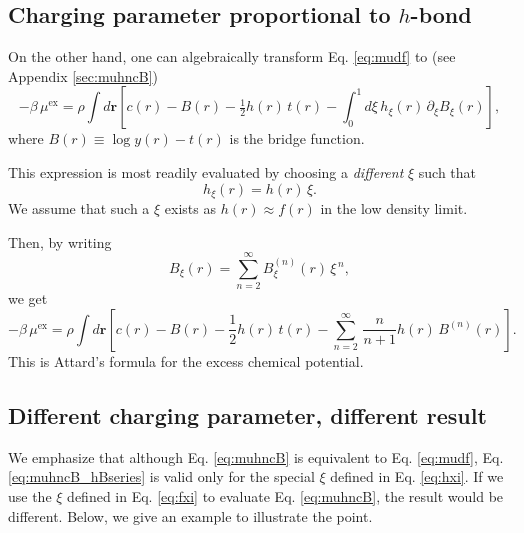 \documentclass[preprint]{revtex4-1}
\newcommand{\vct}[1]{\mathbf{#1}}
\providecommand{\vr}{} %
\renewcommand{\vr}{\vct{r}}
\newcommand{\supex}[1]{ { { #1 }^{ \mathrm{ex} } } }
\newcommand{\muex}{\supex{\mu}}
\begin{document}
\subsection{Charging parameter proportional to $h$-bond}



On the other hand,
one can algebraically transform Eq. \eqref{eq:mudf}
to (see Appendix \ref{sec:muhncB})
%
\begin{equation}
  -\beta \, \muex
=
  \rho \int d\vr
  \left[ c(r) - B(r) - \tfrac{1}{2} h(r) \, t(r)
  - \int_0^1 d\xi \, h_\xi(r) \, \partial_\xi B_\xi(r) \right],
\label{eq:muhncB}
\end{equation}
where $B(r) \equiv \log y(r) - t(r)$ is the bridge function.

This expression is most readily evaluated
by choosing a \emph{different} $\xi$ such that
\begin{equation}
  h_{\xi}(r) = h(r) \, \xi.
  \label{eq:hxi}
\end{equation}
We assume that such a $\xi$ exists
as $h(r) \approx f(r)$ in the low density limit.

Then, by writing
\begin{equation}
  B_{\xi}(r) = \sum_{n = 2}^\infty B^{(n)}_{\xi}(r) \, {\xi}^{\, n},
\label{eq:Bxi}
\end{equation}
we get\cite{attard1991}
\begin{equation}
  -\beta \, \muex
=
  \rho \int d\vr
  \left[ c(r) - B(r) - \frac{1}{2} h(r) \, t(r)
   - \sum_{n = 2}^\infty \, \frac{n}{n+1} h(r) \, B^{(n)}(r) \right].
\label{eq:muhncB_hBseries}
\end{equation}
This is Attard's formula for the excess chemical potential.




\subsection{Different charging parameter, different result}



We emphasize that although
Eq. \eqref{eq:muhncB} is equivalent to Eq. \eqref{eq:mudf},
Eq. \eqref{eq:muhncB_hBseries} is valid
only for the special $\xi$ defined in Eq. \eqref{eq:hxi}.
%
If we use the $\xi$ defined in Eq. \eqref{eq:fxi}
to evaluate Eq. \eqref{eq:muhncB},
the result would be different.
%
Below, we give an example to illustrate the point.
\end{document}
